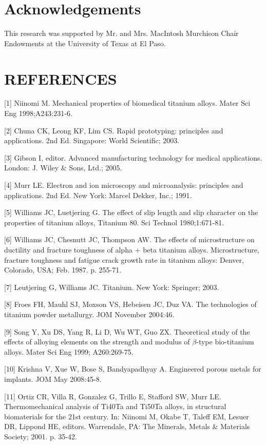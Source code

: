 \documentclass[10pt]{article}
\begin{document}
\section*{Acknowledgements}
This research was supported by Mr. and Mrs. MacIntosh Murchison Chair Endowments at the University of Texas at El Paso.

\section*{REFERENCES}
[1] Niinomi M. Mechanical properties of biomedical titanium alloys. Mater Sci Eng 1998;A243:231-6.

[2] Chuna CK, Leong KF, Lim CS. Rapid prototyping: principles and applications. 2nd Ed. Singapore: World Scientific; 2003.

[3] Gibson I, editor. Advanced manufacturing technology for medical applications. London: J. Wiley \& Sons, Ltd.; 2005.

[4] Murr LE. Electron and ion microscopy and microanalysis: principles and applications. 2nd Ed. New York: Marcel Dekker, Inc.; 1991.

[5] Williams JC, Luetjering G. The effect of slip length and slip character on the properties of titanium alloys, Titanium 80. Sci Technol 1980;1:671-81.

[6] Williams JC, Chesnutt JC, Thompson AW. The effects of microstructure on ductility and fracture toughness of alpha + beta titanium alloys. Microstructure, fracture toughness and fatigue crack growth rate in titanium alloys: Denver, Colorado, USA; Feb. 1987. p. 255-71.

[7] Leutjering G, Williams JC. Titanium. New York: Springer; 2003.

[8] Froes FH, Mauhl SJ, Moxson VS, Hebeisen JC, Duz VA. The technologies of titanium powder metallurgy. JOM November 2004:46.

[9] Song Y, Xu DS, Yang R, Li D, Wu WT, Guo ZX. Theoretical study of the effects of alloying elements on the strength and modulus of $\beta$-type bio-titanium alloys. Mater Sci Eng 1999; A260:269-75.

[10] Krishna V, Xue W, Bose S, Bandyapadhyay A. Engineered porous metals for implants. JOM May 2008:45-8.

[11] Ortiz CR, Villa R, Gonzalez G, Trillo E, Stafford SW, Murr LE. Thermomechanical analysis of Ti40Ta and Ti50Ta alloys, in structural biomaterials for the 21st century. In: Niinomi M, Okabe T, Taleff EM, Lesuer DR, Lippond HE, editors. Warrendale, PA: The Minerals, Metals \& Materials Society; 2001. p. 35-42.
\end{document}
